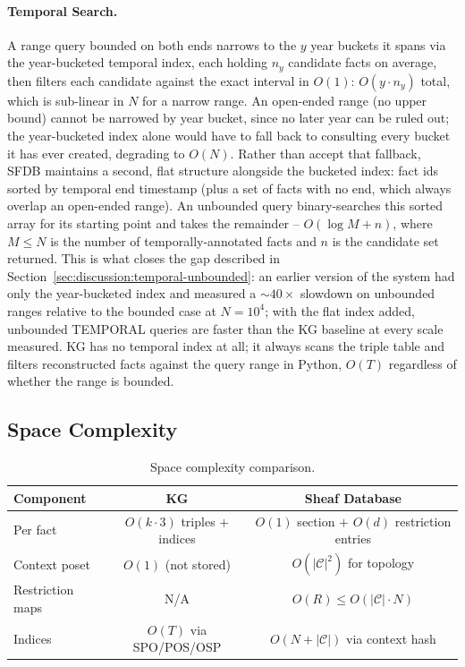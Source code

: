 \paragraph{Temporal Search.} A range query bounded on both ends narrows to the
$y$ year buckets it spans via the year-bucketed temporal index, each holding
$n_y$ candidate facts on average, then filters each candidate against the
exact interval in $O(1)$: $O(y \cdot n_y)$ total, which is sub-linear in $N$
for a narrow range. An open-ended range (no upper bound) cannot be narrowed
by year bucket, since no later year can be ruled out; the year-bucketed
index alone would have to fall back to consulting every bucket it has ever
created, degrading to $O(N)$. Rather than accept that fallback, SFDB
maintains a second, flat structure alongside the bucketed index: fact ids
sorted by temporal end timestamp (plus a set of facts with no end, which
always overlap an open-ended range). An unbounded query binary-searches
this sorted array for its starting point and takes the remainder --
$O(\log M + n)$, where $M \leq N$ is the number of temporally-annotated
facts and $n$ is the candidate set returned. This is what closes the gap
described in Section~\ref{sec:discussion:temporal-unbounded}: an earlier
version of the system had only the year-bucketed index and measured a
$\sim 40\times$ slowdown on unbounded ranges relative to the bounded case
at $N=10^4$; with the flat index added, unbounded TEMPORAL queries are
faster than the KG baseline at every scale measured. KG has no temporal
index at all; it always scans the triple table and filters reconstructed
facts against the query range in Python, $O(T)$ regardless of whether the
range is bounded.

\subsection{Space Complexity}
\label{sec:complexity:space}

\begin{table}[ht]
\centering
\caption{Space complexity comparison.}
\label{tab:complexity:space}
\begin{tabular}{@{}lcc@{}}
\toprule
Component & KG & Sheaf Database \\
\midrule
Per fact & $O(k \cdot 3)$ triples $+$ indices & $O(1)$ section $+$ $O(d)$ restriction entries \\
Context poset & $O(1)$ (not stored) & $O(|\mathcal{C}|^2)$ for topology \\
Restriction maps & N/A & $O(R) \leq O(|\mathcal{C}| \cdot N)$ \\
Indices & $O(T)$ via SPO/POS/OSP & $O(N + |\mathcal{C}|)$ via context hash \\
\bottomrule
\end{tabular}
\end{table}


